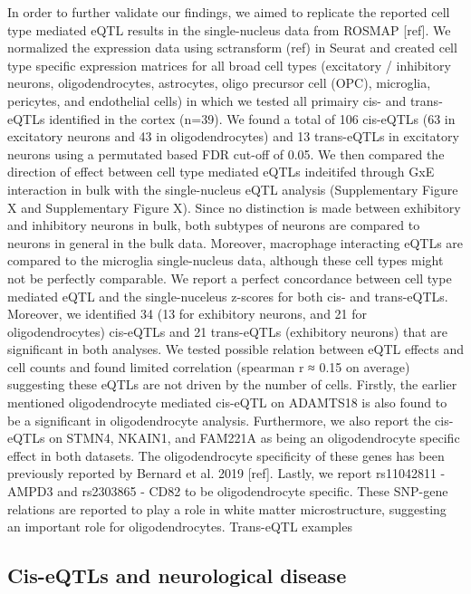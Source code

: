 In order to further validate our findings, we aimed to replicate the reported cell type mediated eQTL results in the single-nucleus data from ROSMAP [ref]. We normalized the expression data using sctransform (ref) in Seurat and created cell type specific expression matrices for all broad cell types (excitatory / inhibitory neurons, oligodendrocytes, astrocytes, oligo precursor cell (OPC), microglia, pericytes, and endothelial cells) in which we tested all primairy cis- and trans-eQTLs identified in the cortex (n=39). We found a total of 106 cis-eQTLs (63 in excitatory neurons and 43 in oligodendrocytes) and 13 trans-eQTLs in excitatory neurons using a permutated based FDR cut-off of 0.05. We then compared the direction of effect between cell type mediated eQTLs indeitifed through GxE interaction in bulk with the single-nucleus eQTL analysis (Supplementary Figure X and Supplementary Figure X). Since no distinction is made between exhibitory and inhibitory neurons in bulk, both subtypes of neurons are compared to neurons in general in the bulk data. Moreover, macrophage interacting eQTLs are compared to the microglia single-nucleus data, although these cell types might not be perfectly comparable. We report a perfect concordance between cell type mediated eQTL and the single-nuceleus z-scores for both cis- and trans-eQTLs. Moreover, we identified 34 (13 for exhibitory neurons, and 21 for oligodendrocytes) cis-eQTLs and 21 trans-eQTLs (exhibitory neurons) that are significant in both analyses. We tested possible relation between eQTL effects and cell counts and found limited correlation (spearman r ≈ 0.15 on average) suggesting these eQTLs are not driven by the number of cells. Firstly, the earlier mentioned oligodendrocyte mediated cis-eQTL on ADAMTS18 is also found to be a significant in oligodendrocyte analysis. Furthermore, we also report the cis-eQTLs on STMN4, NKAIN1, and FAM221A as being an oligodendrocyte specific effect in both datasets. The oligodendrocyte specificity of these genes has been previously reported by Bernard et al. 2019 [ref]. Lastly, we report rs11042811 - AMPD3 and rs2303865 - CD82 to be oligodendrocyte specific. These SNP-gene relations are reported to play a role in white matter microstructure, suggesting an important role for oligodendrocytes. Trans-eQTL examples 

\subsection{Cis-eQTLs and neurological disease}

